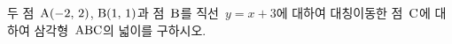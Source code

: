 두 점~$\mathrm{A}(-2,\mkern3mu 2)$, $\mathrm{B}(1,\mkern3mu 1)$과 점~$\mathrm{B}$를 직선~$y=x+3$에 대하여 대칭이동한 점~$\mathrm{C}$에 대하여 삼각형~$\mathrm{ABC}$의 넓이를 구하시오.
